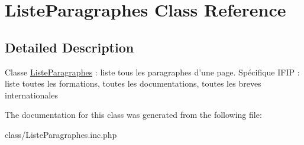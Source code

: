 \hypertarget{class_liste_paragraphes}{
\section{ListeParagraphes Class Reference}
\label{class_liste_paragraphes}
}


\subsection{Detailed Description}
Classe \hyperlink{class_liste_paragraphes}{ListeParagraphes} : liste tous les paragraphes d'une page. Spécifique IFIP : liste toutes les formations, toutes les documentations, toutes les breves internationales 

The documentation for this class was generated from the following file:\begin{DoxyCompactItemize}
\item 
class/ListeParagraphes.inc.php\end{DoxyCompactItemize}
